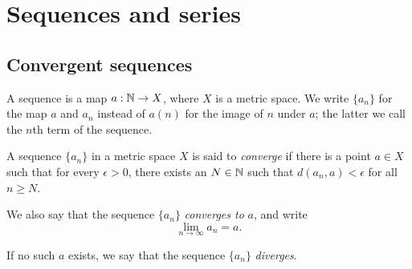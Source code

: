 \chapter{Sequences and series}

\section*{Convergent sequences}

\begin{definition}
    A sequence is a map \(a: \mathbb{N} \to X\), where \(X\) is a metric space. We write \(\{a_n\}\) for the map \(a\) and \(a_n\) instead of \(a(n)\) for the image of \(n\) under \(a\); the latter we call the \(n\)th term of the sequence.
\end{definition}

\begin{definition}
    A sequence \(\{a_n\}\) in a metric space \(X\) is said to \emph{converge} if there is a point \(a \in X\) such that for every \(\epsilon > 0\), there exists an \(N \in \mathbb{N}\) such that \(d(a_n, a) < \epsilon\) for all \(n \geq N\).

    We also say that the sequence \(\{a_n\}\) \emph{converges to} \(a\), and write 
    \[
        \lim_{n \to \infty} a_n = a.
    \]

    If no such \(a\) exists, we say that the sequence \(\{a_n\}\) \emph{diverges}.
\end{definition}

